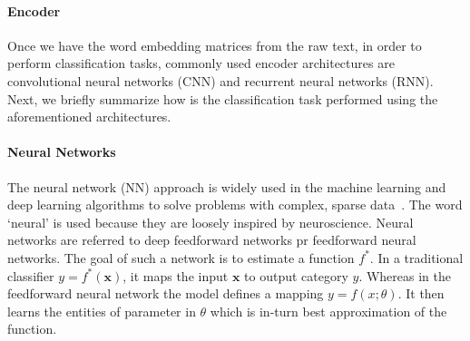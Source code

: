 \paragraph{Encoder} Once we have the word embedding matrices from the raw text, in order to perform classification tasks, commonly used encoder architectures are convolutional neural networks (CNN) and recurrent neural networks (RNN). Next, we briefly summarize how is the classification task performed using the aforementioned architectures.

\paragraph{Neural Networks}
The neural network (NN) approach is widely used in the machine learning and deep learning algorithms to solve problems with complex, sparse data~\cite{lecun2015deep}. The word `neural' is used because they are loosely inspired by neuroscience. 
Neural networks are referred to deep feedforward networks pr feedforward neural networks. The goal of such a network is to estimate a function $f^*$.  In a traditional classifier $ y = f^*(\textbf{x})$, it maps the input $\textbf{x}$ to output category $y$. Whereas in the feedforward neural network the model defines a mapping $ y = f(x;\theta)$. It then learns the entities of parameter in $\theta$ which is in-turn best approximation of the function. 

